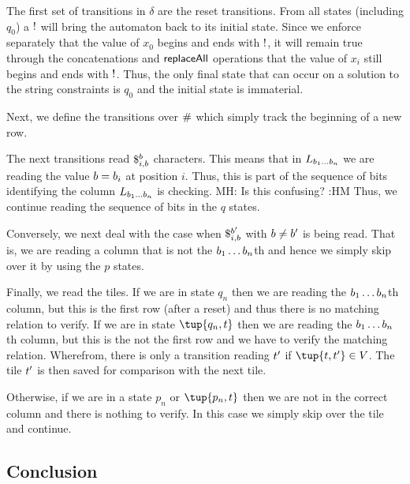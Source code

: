 \documentclass{article}
\newcommand{\mat}[1]{\color{cyan} {MH: #1 :HM} \color{black}}
\begin{document}
The first set of transitions in $\delta$ are the reset transitions.
From all states (including $q_0$) a $\resetchar$ will bring the automaton back to its initial state.
Since we enforce separately that the value of $x_0$ begins and ends with $\resetchar$, it will remain true through the concatenations and $\replaceall$ operations that the value of $x_i$ still begins and ends with $\resetchar$.
Thus, the only final state that can occur on a solution to the string constraints is $q_0$ and the initial state is immaterial.

Next, we define the transitions over $\rowdelim$ which simply track the beginning of a new row.

The next transitions read
$\repl{i}{\bit}{\bit}$
characters.
This means that in
$L_{\bit_1 \ldots \bit_n}$
we are reading the value $\bit = \bit_i$ at position $i$.
Thus, this is part of the sequence of bits identifying the column
$L_{\bit_1 \ldots \bit_n}$
is checking.
\mat{Is this confusing?}
Thus, we continue reading the sequence of bits in the $q$ states.

Conversely, we next deal with the case when
$\repl{i}{\bit}{\bit'}$
with $\bit \neq \bit'$ is being read.
That is, we are reading a column that is not the
$\bit_1\ldots\bit_n$th
and hence we simply skip over it by using the $p$ states.

Finally, we read the tiles.
If we are in state $q_n$ then we are reading the
$\bit_1\ldots\bit_n$th
column, but this is the first row (after a reset) and thus there is no matching relation to verify.
If we are in state $\tup{q_n, \tile}$ then we are reading the
$\bit_1\ldots\bit_n$th
column, but this is the not the first row and we have to verify the matching relation.
Wherefrom, there is only a transition reading $\tile'$ if
$\tup{\tile, \tile'} \in \vcons$.
The tile $\tile'$ is then saved for comparison with the next tile.

Otherwise, if we are in a state $p_n$ or $\tup{p_n, \tile}$ then we are not in the correct column and there is nothing to verify.
In this case we simply skip over the tile and continue.


\subsection{Conclusion}
\end{document}
